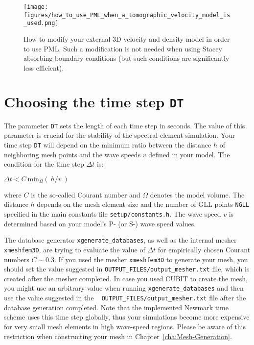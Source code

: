 \begin{figure}[htbp]
\noindent \begin{centering}
\texttt{[image: figures/how\_to\_use\_PML\_when\_a\_tomographic\_velocity\_model\_is\_used.png]}
\par\end{centering}
\caption{How to modify your external 3D velocity and density model in order
to use PML. Such a modification is not needed when using Stacey absorbing
boundary conditions (but such conditions are significantly less efficient).}
\label{fig:modify_external_velocity_model_to_use_PML}
\end{figure}


\section{Choosing the time step \texttt{DT}}\label{sec:Choosing-the-Time-Step}

The parameter \texttt{DT} sets the length of each time step in seconds.
The value of this parameter is crucial for the stability of the spectral-element
simulation. Your time step \texttt{DT} will depend on the minimum
ratio between the distance $h$ of neighboring mesh points and the
wave speeds $v$ defined in your model. The condition for the time
step $\Delta t$ is:
\begin{lyxcode}
$\Delta t<C~\mathrm{min}_{\Omega}(~h/v~)$
\end{lyxcode}
where $C$ is the so-called Courant number and $\Omega$ denotes the
model volume. The distance $h$ depends on the mesh element size and
the number of GLL points \texttt{NGLL} specified in the main constants
file \texttt{setup/constants.h}. The wave speed $v$ is determined based on your model's P- (or S-)
wave speed values.\newline


The database generator \texttt{xgenerate\_databases}, as well as the
internal mesher \texttt{xmeshfem3D}, are trying to evaluate the value
of $\Delta t$ for empirically chosen Courant numbers $C\sim0.3$.
If you used the mesher \texttt{xmeshfem3D} to generate your mesh,
you should set the value suggested in \texttt{OUTPUT\_FILES/output\_mesher.txt}
file, which is created after the mesher completed. In case you used
CUBIT to create the mesh, you might use an arbitrary value when running
\texttt{xgenerate\_databases} and then use the value suggested in
the ~\newline
 \texttt{OUTPUT\_FILES/output\_mesher.txt} file after the database
generation completed. Note that the implemented Newmark time scheme
uses this time step globally, thus your simulations become more expensive
for very small mesh elements in high wave-speed regions. Please be
aware of this restriction when constructing your mesh in Chapter~\ref{cha:Mesh-Generation}.

